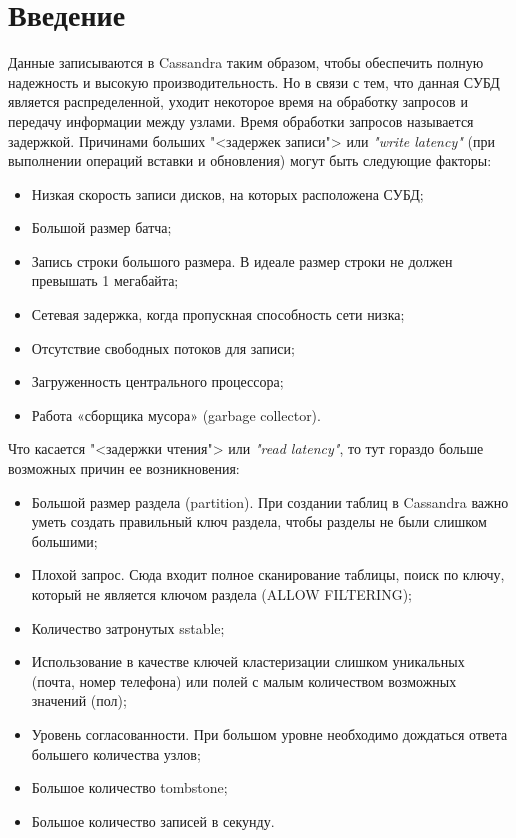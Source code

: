 \section*{\LARGE Введение}

Данные записываются в Cassandra таким образом, чтобы обеспечить
полную надежность и высокую производительность. Но в связи с тем, что данная
СУБД является распределенной, уходит некоторое время на обработку запросов
и передачу информации между узлами. Время обработки запросов называется
задержкой. Причинами больших "<задержек записи"> или \textit{"write latency"}
(при выполнении операций вставки и обновления) могут быть следующие факторы:

\begin{itemize}
	\item Низкая скорость записи дисков, на которых расположена СУБД;
	\item Большой размер батча;
	\item Запись строки большого размера. В идеале размер строки не должен
		превышать 1 мегабайта;
	\item Сетевая задержка, когда пропускная способность сети низка;
	\item Отсутствие свободных потоков для записи;
	\item Загруженность центрального процессора;
	\item Работа «сборщика мусора» (garbage collector).
\end{itemize}

Что касается "<задержки чтения"> или \textit{"read latency"},
то тут гораздо больше возможных причин ее возникновения:

\begin{itemize}
	\item Большой размер раздела (partition). При создании таблиц в
		Cassandra важно уметь создать правильный ключ раздела, чтобы разделы не
		были слишком большими;
	\item Плохой запрос. Сюда входит полное сканирование таблицы, поиск
		по ключу, который не является ключом раздела (ALLOW FILTERING);
	\item Количество затронутых sstable;
	\item Использование в качестве ключей кластеризации слишком
		уникальных (почта, номер телефона) или полей с малым количеством
		возможных значений (пол);
	\item Уровень согласованности. При большом уровне необходимо
		дождаться ответа большего количества узлов;
	\item Большое количество tombstone;
	\item Большое количество записей в секунду.
\end{itemize}


